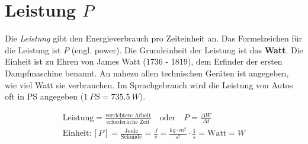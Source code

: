 \section*{Leistung $P$}

Die \emph{Leistung} gibt den Energieverbrauch pro Zeiteinheit an. Das Formelzeichen 
für die Leistung ist $P$ (engl. power). Die Grundeinheit der Leistung ist das {\bf Watt}.
Die Einheit ist zu Ehren von James Watt (1736 - 1819), dem Erfinder der ersten Dampfmaschine benannt.
An nahezu allen technischen Geräten ist angegeben, wie viel Watt sie verbrauchen.
Im Sprachgebrauch wird die Leistung von Autos oft in PS angegeben (\(\SI{1}{PS}= \SI{735.5}{W}\)).


\begin{cbox}
\begin{gather*}
	\text{Leistung} = \frac{\text{verrichtete Arbeit}}{\text{erforderliche Zeit}}\quad\text{oder}\quad P=\frac{\Delta W}{\Delta t}\\
	\text{Einheit}: [P] = \frac{\text{Joule}}{\text{Sekunde}}=\frac{\si{J}}{\si{s}}=\frac{\si{kg}\cdot\si{m^2}}{\si{s^2}}\cdot \frac{1}{\si{s}}=\text{Watt}=\si{W}
\end{gather*}
\end{cbox}



\newpage




\newpage



